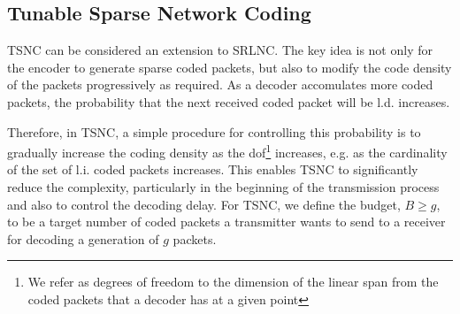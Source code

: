 

%

\subsection{Tunable Sparse Network Coding}

\ac{TSNC} can be considered an extension to \ac{SRLNC}. The key idea is
not only for the encoder to generate sparse coded packets, but also to
modify the code density of the packets progressively as required. As a
decoder accomulates more coded packets, the probability that the next
received coded packet will be \ac{l.d.} increases.

Therefore, in \ac{TSNC}, a simple procedure for controlling this probability
is to gradually increase the coding density as the \ac{dof}\footnote{We refer
as degrees of freedom to the dimension of the linear span from the coded
packets that a decoder has at a given point} increases, e.g. as the
cardinality of the set of \ac{l.i.} coded packets increases. This enables
\ac{TSNC} to significantly reduce the complexity, particularly in the
beginning of the transmission process and also to control the decoding
delay. For \ac{TSNC}, we define the budget, $B \geq g$, to be a target
number of coded packets a transmitter wants to send to a receiver
for decoding a generation of $g$ packets.

